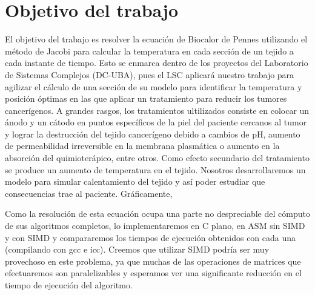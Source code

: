 \documentclass[a4paper]{article}
\begin{document}
\newtheorem{teo}{Teorema}[section]
\newtheorem{propo}{Proposici\'{o}n}[section]
\newtheorem{lema}{Lema}[section]
\newtheorem{coro}{Corolario}[section]
\newtheorem{defi}{Definici\'{o}n}[section]

\newpage
\setcounter{page}{1}
\pagestyle{plain}

\newpage


\newcommand{\Asig}{\ensuremath{\leftarrow}}
\newcommand{\AndY}{\ensuremath{\wedge}}
\newcommand{\Or}{\ensuremath{\vee}}
\newcommand{\Not}{\ensuremath{\neg}}
\newcommand{\NotEq}{\ensuremath{\neq}}
\newcommand{\MayorIg}{\ensuremath{\geq}}
\newcommand{\tabu}{\hspace*{0.7cm}}
\newcommand{\ctabu}{\hspace*{0.8cm}}
\newcommand{\htabu}{\hspace*{0.35cm}}
\newcommand{\moduloNombre}[1]{\textbf{#1}}

\section{Objetivo del trabajo}

El objetivo del trabajo es resolver la ecuación de Biocalor de Pennes utilizando el método de Jacobi para calcular la temperatura en cada sección de un tejido a cada instante de tiempo. Esto se enmarca dentro de los proyectos del Laboratorio de Sistemas Complejos (DC-UBA), pues el LSC aplicará nuestro trabajo para agilizar el cálculo de una sección de su modelo para identificar la temperatura y posición óptimas en las que aplicar un tratamiento para reducir los tumores cancerígenos. A grandes rasgos, los tratamientos ultilizados consiste en colocar un ánodo y un cátodo en puntos específicos de la piel del paciente cercanos al tumor y lograr la destrucción del tejido cancerígeno debido a cambios de pH, aumento de permeabilidad irreversible en la membrana plasmática o aumento en la absorción del quimioterápico, entre otros. Como efecto secundario del tratamiento se produce un aumento de temperatura en el tejido. Nosotros desarrollaremos un modelo para simular calentamiento del tejido y así poder estudiar que consecuencias trae al paciente. Gráficamente,


Como la resolución de esta ecuación ocupa una parte no despreciable del cómputo de sus algoritmos completos, lo implementaremos en C plano, en ASM sin SIMD y con SIMD y compararemos los tiempos de ejecución obtenidos con cada una (compilando con gcc e icc). Creemos que utilizar SIMD podría ser muy provechoso en este problema, ya que muchas de las operaciones de matrices que efectuaremos son paralelizables y esperamos ver una significante reducción en el tiempo de ejecución del algoritmo.
\end{document}
